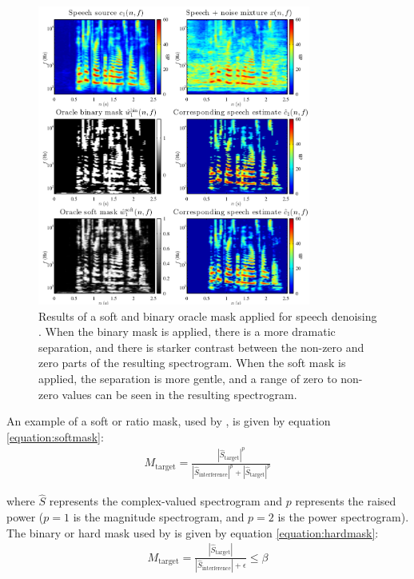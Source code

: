 \documentclass[report.tex]{subfiles}
\begin{document}
\begin{figure}[ht]
	\centering
	\includegraphics[width=0.8\textwidth]{./images-mss/maskdemo.png}
	\caption{Results of a soft and binary oracle mask applied for speech denoising \parencite[71]{masking}. When the binary mask is applied, there is a more dramatic separation, and there is starker contrast between the non-zero and zero parts of the resulting spectrogram. When the soft mask is applied, the separation is more gentle, and a range of zero to non-zero values can be seen in the resulting spectrogram.}
	\label{fig:masks}
\end{figure}

An example of a soft or ratio mask, used by \textcite{fitzgerald1, fitzgerald2}, is given by equation \eqref{equation:softmask}:
\begin{align}
	M_{\text{target}} = \frac{|\hat{S}_{\text{target}}|^{p}}{|\hat{S}_{\text{interference}}|^{p} + |\hat{S}_{\text{target}}|^{p}}\tag{21}\label{equation:softmask}
\end{align}

where $\hat{S}$ represents the complex-valued spectrogram and $p$ represents the raised power ($p = 1$ is the magnitude spectrogram, and $p = 2$ is the power spectrogram). The binary or hard mask used by \textcite{driedger} is given by equation \eqref{equation:hardmask}:
\begin{align}
	M_{\text{target}} = \frac{|\hat{S}_{\text{target}}|}{|\hat{S}_{\text{interference}}| + \epsilon} \le \beta\tag{22}\label{equation:hardmask}
\end{align}
\end{document}
